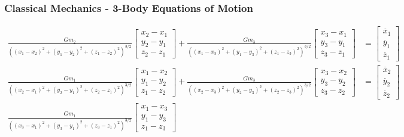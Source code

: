 \documentclass{beamer}
\begin{document}
\begin{frame}
    \frametitle{Classical Mechanics - 3-Body Equations of Motion}

    \tiny \begin{align}
        \frac{G m_2}{((x_1 - x_2)^2 + (y_1 - y_2)^2 + (z_1 - z_2)^2)^{3/2}} 
        \begin{bmatrix}
            x_2 - x_1 \\
            y_2 - y_1 \\
            z_2 - z_1
        \end{bmatrix} + 
        \frac{G m_3}{((x_1 - x_3)^2 + (y_1 - y_3)^2 + (z_1 - z_3)^2)^{3/2}} 
        \begin{bmatrix}
            x_3 - x_1 \\
            y_3 - y_1 \\
            z_3 - z_1
        \end{bmatrix} &= \begin{bmatrix}
            \ddot{x_1} \\
            \ddot{y_1} \\ 
            \ddot{z_1}
        \end{bmatrix} \\
        \frac{G m_1}{((x_2 - x_1)^2 + (y_2 - y_1)^2 + (z_2 - z_1)^2)^{3/2}} 
        \begin{bmatrix}
            x_1 - x_2 \\
            y_1 - y_2 \\
            z_1 - z_2
        \end{bmatrix} + 
        \frac{G m_3}{((x_2 - x_3)^2 + (y_2 - y_3)^2 + (z_2 - z_3)^2)^{3/2}} 
        \begin{bmatrix}
            x_3 - x_2 \\
            y_3 - y_2 \\
            z_3 - z_2
        \end{bmatrix} &= \begin{bmatrix}
            \ddot{x_2} \\
            \ddot{y_2} \\ 
            \ddot{z_2}
        \end{bmatrix} \\
        \frac{G m_1}{((x_3 - x_1)^2 + (y_3 - y_1)^2 + (z_3 - z_1)^2)^{3/2}} 
        \begin{bmatrix}
            x_1 - x_3 \\
            y_1 - y_3 \\
            z_1 - z_3

\end{bmatrix}
\end{align}
\end{frame}
\end{document}
